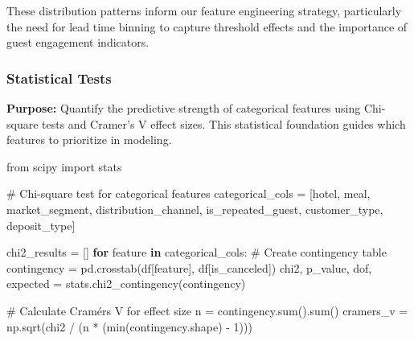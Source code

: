 \documentclass[
  letterpaper,
  DIV=11,
  numbers=noendperiod]{scrartcl}
\newenvironment{Shaded}{\begin{snugshade}}{\end{snugshade}}
\newcommand{\BuiltInTok}[1]{\textcolor[rgb]{0.00,0.23,0.31}{#1}}
\newcommand{\CommentTok}[1]{\textcolor[rgb]{0.37,0.37,0.37}{#1}}
\newcommand{\ControlFlowTok}[1]{\textcolor[rgb]{0.00,0.23,0.31}{\textbf{#1}}}
\newcommand{\DecValTok}[1]{\textcolor[rgb]{0.68,0.00,0.00}{#1}}
\newcommand{\ImportTok}[1]{\textcolor[rgb]{0.00,0.46,0.62}{#1}}
\newcommand{\KeywordTok}[1]{\textcolor[rgb]{0.00,0.23,0.31}{\textbf{#1}}}
\newcommand{\NormalTok}[1]{\textcolor[rgb]{0.00,0.23,0.31}{#1}}
\newcommand{\OperatorTok}[1]{\textcolor[rgb]{0.37,0.37,0.37}{#1}}
\newcommand{\StringTok}[1]{\textcolor[rgb]{0.13,0.47,0.30}{#1}}
\renewenvironment{Shaded}{%
  \begin{tcolorbox}[%
    enhanced,%
    colback=codebg,%
    colframe=codebg,%
    borderline west={3pt}{0pt}{sectionblue},%
    fontupper=\small\ttfamily,%
    boxrule=0pt,%
    arc=0pt,%
    boxsep=5pt,%
    left=2mm,%
    right=2mm,%
    top=2mm,%
    bottom=2mm%
  ]%
}{%
  \end{tcolorbox}%
}
\begin{document}
These distribution patterns inform our feature engineering strategy,
particularly the need for lead time binning to capture threshold effects
and the importance of guest engagement indicators.

\subsubsection{Statistical Tests}\label{statistical-tests}

\textbf{Purpose:} Quantify the predictive strength of categorical
features using Chi-square tests and Cramer's V effect sizes. This
statistical foundation guides which features to prioritize in modeling.

\begin{Shaded}
\begin{Highlighting}[]
\ImportTok{from}\NormalTok{ scipy }\ImportTok{import}\NormalTok{ stats}

\CommentTok{\# Chi{-}square test for categorical features}
\NormalTok{categorical\_cols }\OperatorTok{=}\NormalTok{ [}\StringTok{\textquotesingle{}hotel\textquotesingle{}}\NormalTok{, }\StringTok{\textquotesingle{}meal\textquotesingle{}}\NormalTok{, }\StringTok{\textquotesingle{}market\_segment\textquotesingle{}}\NormalTok{, }\StringTok{\textquotesingle{}distribution\_channel\textquotesingle{}}\NormalTok{, }
                    \StringTok{\textquotesingle{}is\_repeated\_guest\textquotesingle{}}\NormalTok{, }\StringTok{\textquotesingle{}customer\_type\textquotesingle{}}\NormalTok{, }\StringTok{\textquotesingle{}deposit\_type\textquotesingle{}}\NormalTok{]}

\NormalTok{chi2\_results }\OperatorTok{=}\NormalTok{ []}
\ControlFlowTok{for}\NormalTok{ feature }\KeywordTok{in}\NormalTok{ categorical\_cols:}
    \CommentTok{\# Create contingency table}
\NormalTok{    contingency }\OperatorTok{=}\NormalTok{ pd.crosstab(df[feature], df[}\StringTok{\textquotesingle{}is\_canceled\textquotesingle{}}\NormalTok{])}
\NormalTok{    chi2, p\_value, dof, expected }\OperatorTok{=}\NormalTok{ stats.chi2\_contingency(contingency)}
    
    \CommentTok{\# Calculate Cramér\textquotesingle{}s V for effect size}
\NormalTok{    n }\OperatorTok{=}\NormalTok{ contingency.}\BuiltInTok{sum}\NormalTok{().}\BuiltInTok{sum}\NormalTok{()}
\NormalTok{    cramers\_v }\OperatorTok{=}\NormalTok{ np.sqrt(chi2 }\OperatorTok{/}\NormalTok{ (n }\OperatorTok{*}\NormalTok{ (}\BuiltInTok{min}\NormalTok{(contingency.shape) }\OperatorTok{{-}} \DecValTok{1}\NormalTok{)))}
    

\end{Highlighting}
\end{Shaded}
\end{document}
